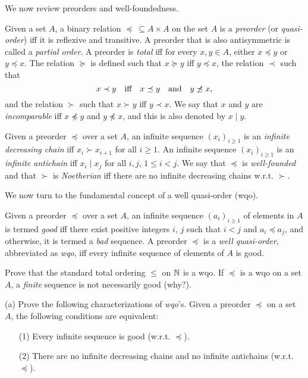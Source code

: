 \documentclass[12pt]{article}
\def\fseq#1#2{(#1_{#2})_{#2\geq 1}}
\begin{document}
\medskip
We now review preorders and well-foundedness. 

\medskip
Given a set $A$, a binary relation $\preceq\ \subseteq A\times A$ 
on the set $A$ is
a {\it preorder\/} (or {\it quasi-order\/}) iff it is reflexive
and transitive. A preorder that is also antisymmetric is called
a {\it partial order\/}. A preorder is {\it total\/} iff
for every $x, y\in A$, either $x\preceq y$ or $y\preceq x$.
The relation $\succeq$ is defined such that
$x\succeq y$ iff $y\preceq x$, the relation $\prec$ such that 
$$x \prec y\quad\hbox{iff}\quad x \preceq y\quad\hbox{and}\quad
y \not\preceq x,$$
and the relation $\succ$ such that
$x \succ y$ iff $y\prec x$.
We say that $x$ and $y$ are {\it incomparable\/} iff
$x\not\preceq y$ and $y\not\preceq x$, and this is also denoted
by $x\mid  y$. 

\medskip
Given a preorder $\preceq$ over a set $A$, an infinite sequence
$\fseq{x}{i}$ is an {\it infinite decreasing chain\/} iff
$x_{i} \succ x_{i+1}$ for all $i\geq 1$.
An infinite sequence
$\fseq{x}{i}$ is an {\it infinite antichain\/} iff
$x_{i}\mid   x_{j}$ for all $i, j$, $1\leq i<j$.
We say that $\preceq$ is {\it well-founded\/} and that
$\succ$ is {\it Noetherian\/} iff there are no infinite decreasing chains
w.r.t. $\succ$.

\medskip
We now turn to the fundamental concept of a well quasi-order (wqo).

\medskip
Given a preorder $\preceq$ over a set $A$, 
an infinite sequence $\fseq{a}{i}$ of elements in $A$ 
is termed {\it good\/} iff there exist positive integers
$i$, $j$ such that $i < j$ and $a_{i}\preceq a_{j}$, and otherwise, 
it is termed a {\it bad\/} sequence.
A preorder $\preceq$ is a {\it well quasi-order\/},
abbreviated as {\it wqo\/}, iff  every infinite
sequence of elements of $A$ is good.

\medskip
Prove that the standard total ordering $\leq$ on $\mathbb{N}$ is a wqo.
If  $\preceq$ is a wqo on a set $A$, a {\it finite\/}
sequence is not  necessarily good (why?).

\medskip
(a)
Prove the following characterizations of {\it wqo\/}'s.
Given a preorder $\preceq$ on a set $A$, the following conditions
are equivalent:
\begin{enumerate}
\item[(1)]
Every infinite sequence is good (w.r.t. $\preceq$).
\medskip
\item[(2)]
There are no infinite decreasing chains 
and no infinite antichains (w.r.t. $\preceq$).
\end{enumerate}
\end{document}
